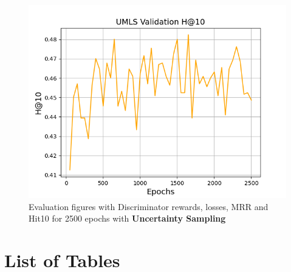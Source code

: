 \begin{figure}
\begin{minipage}{.5\textwidth}
    \end{minipage}%
    \begin{minipage}{.5\textwidth}
      \centering
      \includegraphics[width=0.9\linewidth]{appendices/umls/uncertainty/gan_train_umls_hit10.png}
    \end{minipage}
    \caption{Evaluation figures with Discriminator rewards, losses, \ac{MRR} and Hit\@10 for 2500 epochs with \textbf{Uncertainty Sampling}}
    \label{fig:test}
\end{figure}
 

\pagebreak




\chapter{List of Tables} \label{ch:appendix_tables}